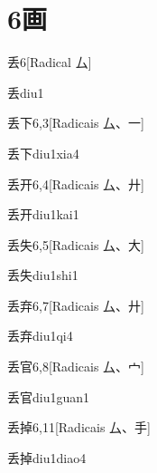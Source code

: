 
\section*{6画}

\begin{entry}{丢}{6}[Radical ⼛]
  \begin{phonetics}{丢}{diu1}
  \end{phonetics}
\end{entry}

\begin{entry}{丢下}{6,3}[Radicais ⼛、⼀]
  \begin{phonetics}{丢下}{diu1xia4}
  \end{phonetics}
\end{entry}

\begin{entry}{丢开}{6,4}[Radicais ⼛、⼶]
  \begin{phonetics}{丢开}{diu1kai1}
  \end{phonetics}
\end{entry}

\begin{entry}{丢失}{6,5}[Radicais ⼛、⼤]
  \begin{phonetics}{丢失}{diu1shi1}
  \end{phonetics}
\end{entry}

\begin{entry}{丢弃}{6,7}[Radicais ⼛、⼶]
  \begin{phonetics}{丢弃}{diu1qi4}
  \end{phonetics}
\end{entry}

\begin{entry}{丢官}{6,8}[Radicais ⼛、⼧]
  \begin{phonetics}{丢官}{diu1guan1}
  \end{phonetics}
\end{entry}

\begin{entry}{丢掉}{6,11}[Radicais ⼛、⼿]
  \begin{phonetics}{丢掉}{diu1diao4}
  \end{phonetics}
\end{entry}

